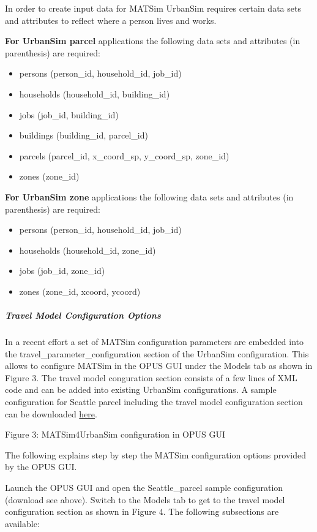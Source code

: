 \documentclass[a4paper,11pt]{report}
\begin{document}
In order to create input data for MATSim UrbanSim requires certain  data sets and attributes to reflect where a person lives and works.

\textbf{For UrbanSim parcel} applications the following data sets and attributes (in parenthesis) are required:
\begin{itemize}
	\item persons (person\_id, household\_id, job\_id)
	\item households (household\_id, building\_id)
	\item jobs (job\_id, building\_id)
	\item buildings (building\_id, parcel\_id)
	\item parcels (parcel\_id, x\_coord\_sp, y\_coord\_sp, zone\_id)
	\item zones (zone\_id)
\end{itemize}

\textbf{For UrbanSim zone} applications the following data sets and attributes (in parenthesis) are required:
\begin{itemize}
	\item persons (person\_id, household\_id, job\_id)
	\item households (household\_id, zone\_id)
	\item jobs (job\_id, zone\_id)
	\item zones (zone\_id, xcoord, ycoord)
\end{itemize}

\subparagraph{Travel Model Configuration Options}

In a recent effort a set of MATSim configuration parameters are  embedded into the travel\_parameter\_configuration section of the UrbanSim  configuration. This allows to configure MATSim in the OPUS GUI under  the Models tab as shown in Figure 3. The travel model conguration  section consists of a few lines of XML code and can be added into  existing UrbanSim configurations. A sample configuration for Seattle  parcel including the travel model configuration section can be  downloaded \href{https://svn.vsp.tu-berlin.de/repos/public-svn/matsim/examples/countries/us/seattle/seattle_parcel.xml}{here}.



Figure 3: MATSim4UrbanSim configuration in OPUS GUI

The following explains step by step the MATSim configuration options provided by the OPUS GUI.

Launch the OPUS GUI and open the Seattle\_parcel sample configuration  (download see above). Switch to the Models tab to get to the travel  model configuration section as shown in Figure 4. The following  subsections are available:
\end{document}

